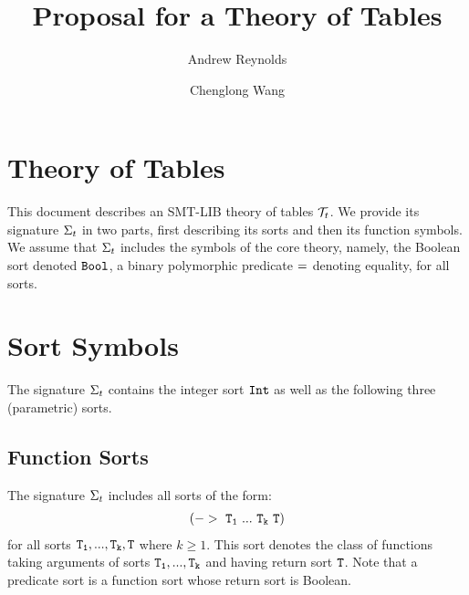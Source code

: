 \documentclass[english,a4paper,10pt]{article}
\begin{document}
\title{Proposal for a Theory of Tables}

\author{Andrew Reynolds \and Chenglong Wang}

\maketitle



\section{Theory of Tables}

This document describes an SMT-LIB theory of tables $\mathcal{T}_{t}$.
We provide its signature $\Sigma_{t}$ in two parts,
first describing its sorts and then its function symbols.
We assume that $\Sigma_{t}$ includes the symbols of the core theory, 
namely, the Boolean sort denoted ${\tt Bool}$,
a binary polymorphic predicate ${\tt =}$ denoting equality, for all sorts.

\section{Sort Symbols}

The signature $\Sigma_{t}$ contains 
the integer sort ${\tt Int}$ as well as
the following three (parametric) sorts.

\subsection{Function Sorts}
The signature $\Sigma_{t}$ includes all sorts of the form:
\begin{align*}
{\tt (->\ T_1\ ...\ T_k\ T)}
\end{align*}
for all sorts ${\tt T_1, ..., T_k, T}$ where $k \geq 1$.
This sort denotes the class of functions taking arguments of sorts ${\tt T_1, ..., T_k}$
and having return sort ${\tt T}$.
Note that a predicate sort is a function sort whose return
sort is Boolean.

\begin{comment}
\paragraph{Notes}
\begin{itemize}
\item The term $\syntax{ 
(lambda\ ((x_1\ T_1)\ ...\ (x_n\ T_n))\ t)
}$
has sort 
$\syntax{(->\ T_1\ ...\ T_n\ T)}$
when $\syntax{t}$ has sort $\syntax{T}$.
\end{itemize}
\end{comment}
\end{document}

